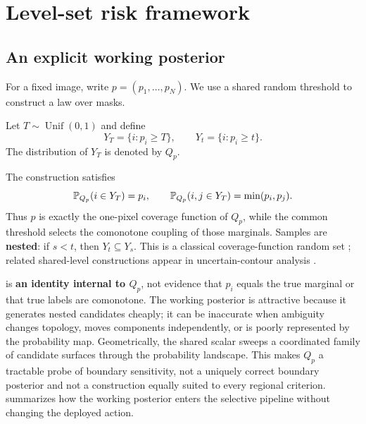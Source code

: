 \section{Level-set risk framework}
\label{sec:framework}

\subsection{An explicit working posterior}
\label{sec:posterior}

For a fixed image, write \(p=(p_1,\ldots,p_N)\). We use a shared random
threshold to construct a law over masks.

\begin{definition}
\label{def:levelset}
Let \(T\sim\operatorname{Unif}(0,1)\) and define
\begin{equation*}
  Y_T=\{i:p_i\geq T\},
  \qquad
  Y_t=\{i:p_i\geq t\}.
\end{equation*}
The distribution of \(Y_T\) is denoted by \(Q_p\).
\end{definition}

The construction satisfies
\begin{equation}
  \mathbb{P}_{Q_p}(i\in Y_T)=p_i,
  \qquad
  \mathbb{P}_{Q_p}(i,j\in Y_T)=\min(p_i,p_j).
  \label{eq:levelset-marginals}
\end{equation}
Thus \(p\) is exactly the one-pixel coverage function of \(Q_p\), while the
common threshold selects the comonotone coupling of those marginals. Samples
are \textbf{nested}: if \(s<t\), then \(Y_t\subseteq Y_s\). This is a classical
coverage-function random set \citep{goodman,molchanov}; related shared-level
constructions appear in uncertain-contour analysis \citep{poethkow,bolin}.

 is \textbf{an identity internal to \(Q_p\)},
not evidence that \(p_i\) equals the true marginal or that true labels are
comonotone. The working posterior is attractive because it generates nested
candidates cheaply; it can be inaccurate when ambiguity changes topology,
moves components independently, or is poorly represented by the probability
map. Geometrically, the shared scalar sweeps a coordinated family of candidate
surfaces through the probability landscape. This makes \(Q_p\) a tractable
probe of boundary sensitivity, not a uniquely correct boundary posterior and
not a construction equally suited to every regional criterion.
 summarizes how the working posterior enters the
selective pipeline without changing the deployed action.

